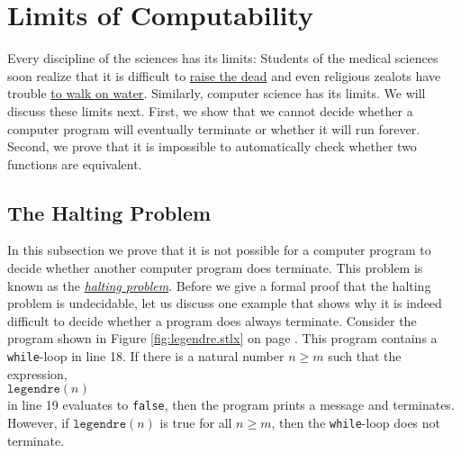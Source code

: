 \chapter{Limits of Computability}
Every discipline of the sciences has its limits: Students of the medical sciences soon realize that
it is difficult to \href{http://www.wowhead.com/spell=61999}{raise the dead} and even religious zealots
have trouble \href{http://www.youtube.com/watch?v=RUMX_b_m3Js}{to walk on water}.  Similarly,
computer science has its limits.  We will discuss 
these limits next.  First, we show that we cannot decide whether a computer program will eventually
terminate or whether it will run forever.  
Second, we prove that it is impossible to automatically check whether two functions are equivalent.


\section{The Halting Problem}
In this subsection we prove that it is not possible for a computer program to decide whether 
another computer program does terminate.  This problem is known as the 
\href{http://en.wikipedia.org/wiki/Halting_problem}{\emph{halting problem}}.
Before we give a formal proof that the halting problem is undecidable, let us
discuss one example that shows why it is indeed difficult to decide whether a program does always
terminate.  Consider the program shown in Figure \ref{fig:legendre.stlx} on page
\pageref{fig:legendre.stlx}.  This program contains a \texttt{while}-loop in line 18.  
If there is a natural number $n \geq m$ such that the expression,
\\[0.2cm]
\hspace*{1.3cm}
$\mathtt{legendre}(n)$
\\[0.2cm]
in line 19 evaluates to \texttt{false}, then the program prints a message and terminates.   However, if 
$\mathtt{legendre}(n)$ is true for all $n \geq m$, then the \texttt{while}-loop does not terminate.


